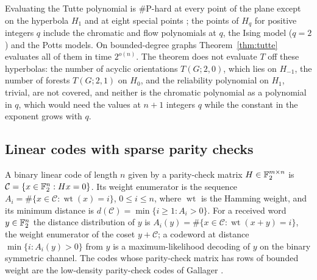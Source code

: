 \begin{remark}\label{rem:tutte}
Evaluating the Tutte polynomial is $\#$P-hard at every point of the plane
except on the hyperbola $H_1$ and at eight special points \cite{JVW90}; the
points of $H_q$ for positive integers $q$ include the chromatic and flow
polynomials at $q$, the Ising model ($q=2$) and the Potts models. On
bounded-degree graphs Theorem~\ref{thm:tutte} evaluates all of them in time
$2^{o(n)}$. The theorem does not evaluate $T$ off these hyperbolas: the number
of acyclic orientations $T(G;2,0)$, which lies on $H_{-1}$, the number of
forests $T(G;2,1)$ on $H_0$, and the reliability polynomial on $H_1$, trivial,
are not covered, and neither is the chromatic polynomial as a polynomial in $q$,
which would need the values at $n+1$ integers $q$ while the constant in the
exponent grows with $q$.
\end{remark}

\subsection{Linear codes with sparse parity checks}\label{ssec:codes}
A binary linear code of length $n$ given by a parity-check matrix
$H\in\mathbb{F}_2^{m\times n}$ is $\mathcal C=\{x\in\mathbb{F}_2^n:Hx=0\}$. Its weight
enumerator is the sequence $A_i=\#\{x\in\mathcal C:\operatorname{wt}(x)=i\}$,
$0\le i\le n$, where $\operatorname{wt}$ is the Hamming weight, and its minimum
distance is $d(\mathcal C)=\min\{i\ge1:A_i>0\}$. For a received word
$y\in\mathbb{F}_2^n$ the distance distribution of $y$ is
$A_i(y)=\#\{x\in\mathcal C:\operatorname{wt}(x+y)=i\}$, the weight enumerator of
the coset $y+\mathcal C$; a codeword at distance $\min\{i:A_i(y)>0\}$ from $y$ is a
maximum-likelihood decoding of $y$ on the binary symmetric channel. The codes
whose parity-check matrix has rows of bounded weight are the low-density
parity-check codes of Gallager \cite{Gal62}.

